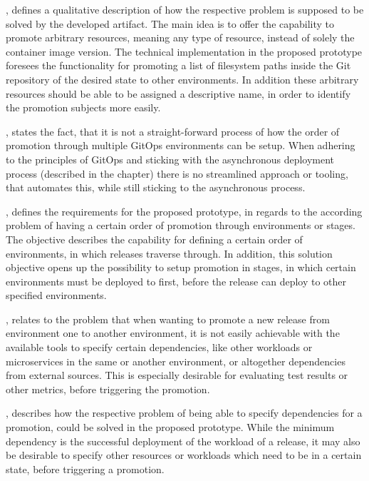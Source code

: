 \textbf{},
defines a qualitative description of how the respective problem is supposed to be solved
by the developed artifact. The main idea is to offer the capability to promote arbitrary resources,
meaning any type of resource, instead of solely the container image version.
The technical implementation in the proposed prototype foresees the functionality for
promoting a list of filesystem paths inside the Git repository of the desired state to other environments.
In addition these arbitrary resources should be able to be assigned a descriptive name,
in order to identify the promotion subjects more easily.

\textbf{},
states the fact, that it is not a straight-forward process of how the order of promotion
through multiple GitOps environments can be setup. When adhering to the principles of GitOps
and sticking with the asynchronous deployment process (described in the
 chapter)
there is no streamlined approach or tooling, that automates this, while still sticking to the asynchronous process.

\textbf{},
defines the requirements for the proposed prototype,
in regards to the according problem of having a certain order of promotion through environments or stages.
The objective describes the capability for defining a certain order of environments, in which releases traverse through.
In addition, this solution objective opens up the possibility to setup promotion in stages, in which
certain environments must be deployed to first, before the release can deploy to other specified environments.

\textbf{},
relates to the problem that when wanting to promote a new release from environment one to another environment,
it is not easily achievable with the available tools to specify certain dependencies, like other workloads or
microservices in the same or another environment, or altogether dependencies from external sources.
This is especially desirable for evaluating test results or other metrics, before triggering the promotion.

\textbf{},
describes how the respective problem of being able to specify dependencies for a promotion,
could be solved in the proposed prototype. While the minimum dependency is the successful deployment
of the workload of a release,
it may also be desirable to specify other resources or workloads which need to be in a certain state,
before triggering a promotion.

